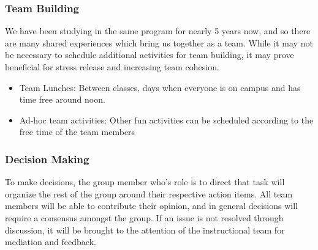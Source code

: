 \documentclass{article}
\begin{document}
\subsubsection*{Team Building}

We have been studying in the same program for nearly 5 years now, and so there are many shared
experiences which bring us together as a team. While it may not be necessary to schedule additional activities
for team building, it may prove beneficial for stress release and increasing team cohesion.
\begin{itemize}
\item Team Lunches: Between classes, days when everyone is on campus and has time free around noon.
\item Ad-hoc team activities: Other fun activities can be scheduled according to the free time of the team
members
\end{itemize}

\subsubsection*{Decision Making}

To make decisions, the group member who's role is to direct that task will organize the rest of the group
around their respective action items. All team members will be able to contribute their opinion, and in general
decisions will require a consensus amongst the group. If an issue is not resolved through discussion, it will be
brought to the attention of the instructional team for mediation and feedback.
\end{document}
